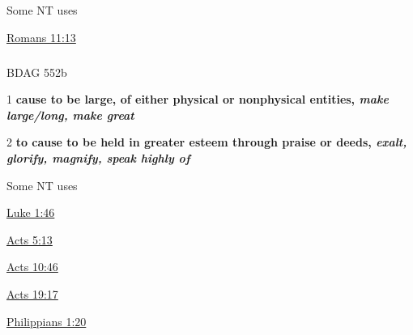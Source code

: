 				
				\begin{compactdesc}
					\item[Some NT uses] \textbf{}
						\begin{compactdesc}
							\item[{\hyperref[ROMANS-11-13]{Romans 11:13}}] 
						\end{compactdesc}
				\end{compactdesc}
				
				
			\subparagraph{\texorpdfstring{\gr{μεγαλύνω}}{}}
				\label{MEGALUNO}
			
				\begin{compactdesc}
					\item[BDAG 552b] \textbf{}
						\begin{compactitem}
							\item[1] \textbf{cause to be large, of either physical or nonphysical entities, \textit{make large/long, make great}}
							\item[2] \textbf{to cause to be held in greater esteem through praise or deeds, \textit{exalt, glorify, magnify, speak highly of}}
						\end{compactitem}
				\end{compactdesc}
				
				
				\begin{compactdesc}
					\item[Some NT uses] \textbf{}
						\begin{compactdesc}
							\item[{\hyperref[LUKE-1-46]{Luke 1:46}}] 
							\item[{\hyperref[ACTS-5-13]{Acts 5:13}}] 
							\item[{\hyperref[ACTS-10-46]{Acts 10:46}}] 
							\item[{\hyperref[ACTS-19-17]{Acts 19:17}}] 
							\item[{\hyperref[PHILIPPIANS-1-20]{Philippians 1:20}}]
						\end{compactdesc}
				\end{compactdesc}
				
